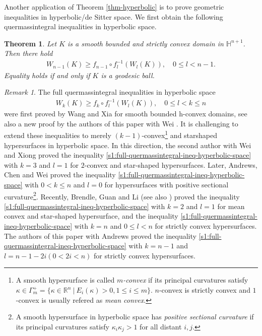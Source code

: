 \documentclass[11pt,reqno]{amsart}
\newtheorem{thm}{Theorem}[section]
\theoremstyle{definition}
\theoremstyle{remark}
\newtheorem{rem}{Remark}
\numberwithin{equation}{section}
\renewcommand{\(}{\left(}
\renewcommand{\)}{\right)}
\renewcommand{\~}{\tilde}
\renewcommand{\-}{\overline}
\renewcommand{\k}{\kappa}
\newcommand{\G}{\Gamma}
\begin{document}
Another application of Theorem \ref{thm-hyperbolic} is to prove geometric inequalities in hyperbolic/de Sitter space. We first obtain the following quermassintegral inequalities in hyperbolic space.
\begin{thm}\label{cor-BS-ineq-hyperbolic-quermassintegral-ineq}
Let $K$ is a smooth bounded and strictly convex domain in $\mathbb H^{n+1}$. Then there hold
\begin{align}\label{quermassintegral-ineq-hyperbolic-strictly-convex-II}
W_{n-1}(K) \geq f_{n-1} \circ f^{-1}_{l}(W_l(K)), \quad  0\leq l<n-1.
\end{align}
Equality holds if and only if $K$ is a geodesic ball.
\end{thm}
\begin{rem}
	The full quermassintegral inequalities in hyperbolic space
	\begin{align}\label{s1:full-quermassintegral-ineq-hyperbolic-space}
	W_k(K) \geq f_k\circ f_l^{-1}(W_{l}(K)), \quad 0\leq l<k\leq n
	\end{align}
	were first proved by Wang and Xia \cite{Wang-Xia14} for smooth bounded h-convex domains, see also a new proof by the authors of this paper with Wei \cite{Hu-Li-Wei2020}. It is challenging to extend these inequalities to merely $(k-1)$-convex\footnote{A smooth hypersurface is called {\em $m$-convex} if its principal curvatures satisfy $\k\in \G_{m}^{+}=\{\k \in \mathbb R^n ~|~ E_i(\k)>0, 1\leq i\leq m \}$. $n$-convex is strictly convex and $1$-convex is usually refered as {\em mean convex}.} and starshaped hypersurfaces in hyperbolic space. In this direction, the second author with Wei and Xiong \cite{LWX14} proved the inequality \eqref{s1:full-quermassintegral-ineq-hyperbolic-space} with $k=3$ and $l=1$ for $2$-convex and star-shaped hypersurfaces. Later, Andrews, Chen and Wei \cite{ACW2018} proved the inequality \eqref{s1:full-quermassintegral-ineq-hyperbolic-space} with $0<k\leq n$ and $l=0$ for hypersurfaces with positive sectional curvature\footnote{A smooth hypersurface in hyperbolic space has {\em positive sectional curvature} if its principal curvatures satisfy $\k_i\k_j>1$ for all distant $i,j$.}. Recently, Brendle, Guan and Li \cite{BGL19} (see also \cite{GL21}) proved the inequality \eqref{s1:full-quermassintegral-ineq-hyperbolic-space} with $k=2$ and $l=1$ for mean convex and star-shaped hypersurface, and the inequality \eqref{s1:full-quermassintegral-ineq-hyperbolic-space} with $k=n$ and $0\leq l<n$ for strictly convex hypersurfaces. The authors of this paper with Andrews proved the inequality \eqref{s1:full-quermassintegral-ineq-hyperbolic-space} with $k=n-1$ and $l=n-1-2i (0<2i<n)$ for strictly convex hypersurfaces. 
\end{rem}
\end{document}
